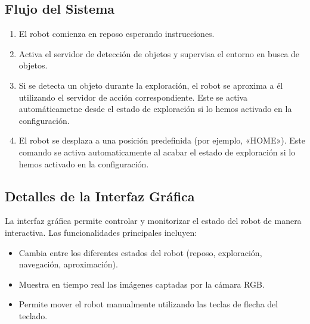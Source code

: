 \documentclass[a4paper,10pt,spanish]{sphinxmanual}
\begin{document}
\subsection{Flujo del Sistema}
\label{\detokenize{uso:flujo-del-sistema}}\begin{enumerate}
%
\item {} 
\sphinxAtStartPar
{}
El robot comienza en reposo esperando instrucciones.

\item {} 
\sphinxAtStartPar
{}
Activa el servidor de detección de objetos y supervisa el entorno en busca de objetos.

\item {} 
\sphinxAtStartPar
{}
Si se detecta un objeto durante la exploración, el robot se aproxima a él utilizando el servidor de acción correspondiente. Este se activa automáticametne desde el estado de exploración si lo hemos activado en la configuración.

\item {} 
\sphinxAtStartPar
{}
El robot se desplaza a una posición predefinida (por ejemplo, «HOME»). Este comando se activa automaticamente al acabar el estado de exploración si lo hemos activado en la configuración.

\end{enumerate}


\subsection{Detalles de la Interfaz Gráfica}
\label{\detokenize{uso:detalles-de-la-interfaz-grafica}}
\sphinxAtStartPar
La interfaz gráfica permite controlar y monitorizar el estado del robot de manera interactiva. Las funcionalidades principales incluyen:
\begin{itemize}
\item {} 
\sphinxAtStartPar
{}
Cambia entre los diferentes estados del robot (reposo, exploración, navegación, aproximación).

\item {} 
\sphinxAtStartPar
{}
Muestra en tiempo real las imágenes captadas por la cámara RGB.

\item {} 
\sphinxAtStartPar
{}
Permite mover el robot manualmente utilizando las teclas de flecha del teclado.

\end{itemize}
\end{document}
